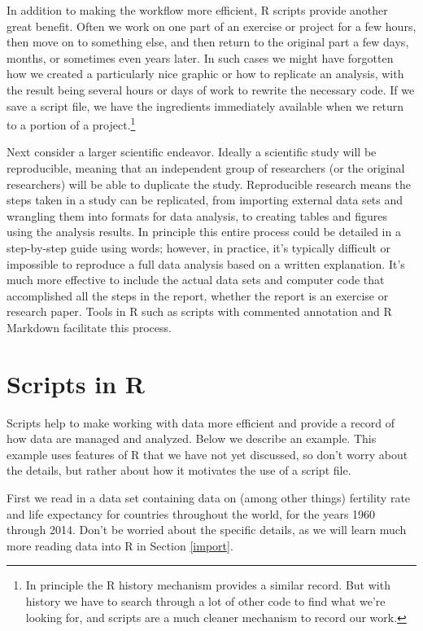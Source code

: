 \documentclass[
]{krantz}
\begin{document}
In addition to making the workflow more efficient, R scripts provide another great benefit. Often we work on one part of an exercise or project for a few hours, then move on to something else, and then return to the original part a few days, months, or sometimes even years later. In such cases we might have forgotten how we created a particularly nice graphic or how to replicate an analysis, with the result being several hours or days of work to rewrite the necessary code. If we save a script file, we have the ingredients immediately available when we return to a portion of a project.\footnote{In principle the R history mechanism provides a similar record. But with history we have to search through a lot of other code to find what we're looking for, and scripts are a much cleaner mechanism to record our work.}

Next consider a larger scientific endeavor. Ideally a scientific study will be reproducible, meaning that an independent group of researchers (or the original researchers) will be able to duplicate the study. Reproducible research means the steps taken in a study can be replicated, from importing external data sets and wrangling them into formats for data analysis, to creating tables and figures using the analysis results. In principle this entire process could be detailed in a step-by-step guide using words; however, in practice, it's typically difficult or impossible to reproduce a full data analysis based on a written explanation. It's much more effective to include the actual data sets and computer code that accomplished all the steps in the report, whether the report is an exercise or research paper. Tools in R such as scripts with commented annotation and R Markdown facilitate this process.

\hypertarget{scripts-in-r}{%
\section{Scripts in R}\label{scripts-in-r}}

Scripts help to make working with data more efficient and provide a record of how data are managed and analyzed. Below we describe an example. This example uses features of R that we have not yet discussed, so don't worry about the details, but rather about how it motivates the use of a script file.

First we read in a data set containing data on (among other things) fertility rate and life expectancy for countries throughout the world, for the years 1960 through 2014. Don't be worried about the specific details, as we will learn much more reading data into R in Section \ref{import}.
\end{document}

